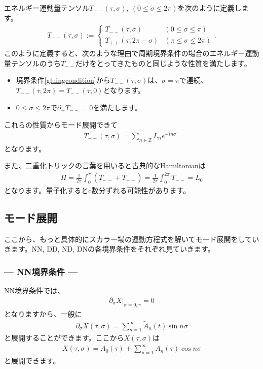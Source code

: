 \documentclass[report,paper=a4, fontsize=12pt, line_length=16cm, number_of_lines=34,dvipdfmx]{jlreq}
\numberwithin{equation}{chapter}
\numberwithin{equation}{section}
\newcommand{\Zb}{\mathbb{Z}}
\newcommand{\del}{\partial}
\newcommand{\At}{\widetilde{A}}
\begin{document}
エネルギー運動量テンソル$T_{--}(\tau,\sigma),\ (0\le \sigma \le 2\pi)$を次のように定義します。
\begin{align}
  T_{--}(\tau,\sigma):=
  \begin{cases}
    T_{--}(\tau,\sigma)& (0\le \sigma \le \pi)\\
    T_{++}(\tau,2\pi-\sigma) & (\pi\le \sigma \le 2\pi)
  \end{cases}.
\end{align}
このように定義すると、次のような理由で周期境界条件の場合のエネルギー運動量テンソルのうち$T_{--}$だけをとってきたものと同じような性質を満たします。
\begin{itemize}
  \item 境界条件\eqref{gluingcondition}から$T_{--}(\tau,\sigma)$は、$\sigma=\pi$で連続、$T_{--}(\tau,2\pi)=T_{--}(\tau,0)$となります。
  \item $0\le \sigma \le 2\pi$で$\del_{+}T_{--}=0$を満たします。
\end{itemize}
これらの性質からモード展開できて
\begin{align}
  T_{--}(\tau,\sigma)=\sum_{n\in\Zb}
  L_{n}e^{-in\sigma^{-}}
\end{align}
となります。

また、二重化トリックの言葉を用いると古典的なHamiltonianは
\begin{align}
  H=\frac{1}{2\pi}\int_{0}^{\pi}(T_{--}+T_{++})
  =\frac{1}{2\pi}\int_{0}^{2\pi}T_{--}
  =L_{0}
\end{align}
となります。量子化するとc数分ずれる可能性があります。

\subsection{モード展開}
ここから、もっと具体的にスカラー場の運動方程式を解いてモード展開をしていきます。NN, DD, ND, DNの各境界条件をそれぞれ見ていきます。
\subsubsection*{--- NN境界条件 ---}
NN境界条件では、
\begin{align}
  \del_{\sigma}X\Bigg|_{\sigma=0,\pi}=0
\end{align}
となりますから、一般に
\begin{align}
  \del_{\sigma}X(\tau,\sigma)=\sum_{n=1}^{\infty}\At_n(t)\sin n\sigma
\end{align}
と展開することができます。ここから$X(\tau,\sigma)$は
\begin{align}
  X(\tau,\sigma)=A_{0}(\tau)+\sum_{n=1}^{\infty}A_{n}(\tau)\cos n\sigma\label{NNmodes0}
\end{align}
と展開できます。
\end{document}
